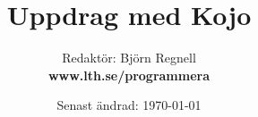 \documentclass[12pt]{book}
\title{\fontsize{40}{40}\bf\sffamily\selectfont Uppdrag med Kojo
}
\author{Redaktör: Björn Regnell \\ \bf www.lth.se/programmera}
\date{Senast ändrad: \today{ }}
\begin{document}
\maketitle
\newpage
\thispagestyle{empty}



\newpage
\begin{multicols}{4}
\tableofcontents
\mainmatter
\end{multicols}

\fontsize{20}{23}\selectfont\raggedright


\end{document}
